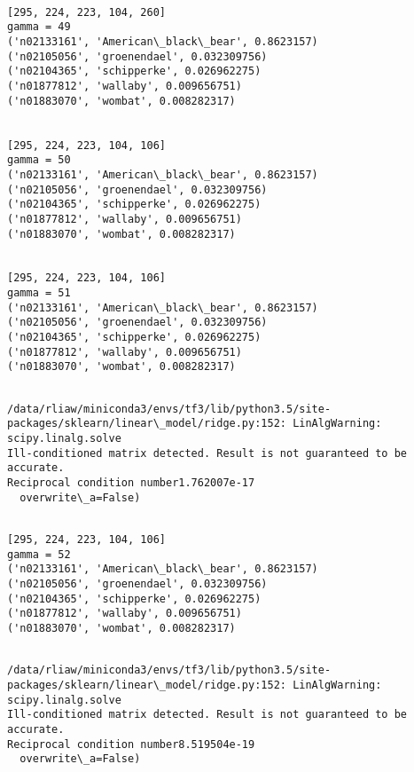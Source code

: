 \documentclass[11pt]{article}
\begin{document}
    \begin{Verbatim}[commandchars=\\\{\}]

[295, 224, 223, 104, 260]
gamma = 49
('n02133161', 'American\_black\_bear', 0.8623157)
('n02105056', 'groenendael', 0.032309756)
('n02104365', 'schipperke', 0.026962275)
('n01877812', 'wallaby', 0.009656751)
('n01883070', 'wombat', 0.008282317)


[295, 224, 223, 104, 106]
gamma = 50
('n02133161', 'American\_black\_bear', 0.8623157)
('n02105056', 'groenendael', 0.032309756)
('n02104365', 'schipperke', 0.026962275)
('n01877812', 'wallaby', 0.009656751)
('n01883070', 'wombat', 0.008282317)


[295, 224, 223, 104, 106]
gamma = 51
('n02133161', 'American\_black\_bear', 0.8623157)
('n02105056', 'groenendael', 0.032309756)
('n02104365', 'schipperke', 0.026962275)
('n01877812', 'wallaby', 0.009656751)
('n01883070', 'wombat', 0.008282317)


    \end{Verbatim}

    \begin{Verbatim}[commandchars=\\\{\}]
/data/rliaw/miniconda3/envs/tf3/lib/python3.5/site-packages/sklearn/linear\_model/ridge.py:152: LinAlgWarning: scipy.linalg.solve
Ill-conditioned matrix detected. Result is not guaranteed to be accurate.
Reciprocal condition number1.762007e-17
  overwrite\_a=False)

    \end{Verbatim}

    \begin{Verbatim}[commandchars=\\\{\}]

[295, 224, 223, 104, 106]
gamma = 52
('n02133161', 'American\_black\_bear', 0.8623157)
('n02105056', 'groenendael', 0.032309756)
('n02104365', 'schipperke', 0.026962275)
('n01877812', 'wallaby', 0.009656751)
('n01883070', 'wombat', 0.008282317)


    \end{Verbatim}

    \begin{Verbatim}[commandchars=\\\{\}]
/data/rliaw/miniconda3/envs/tf3/lib/python3.5/site-packages/sklearn/linear\_model/ridge.py:152: LinAlgWarning: scipy.linalg.solve
Ill-conditioned matrix detected. Result is not guaranteed to be accurate.
Reciprocal condition number8.519504e-19
  overwrite\_a=False)

    \end{Verbatim}
\end{document}
